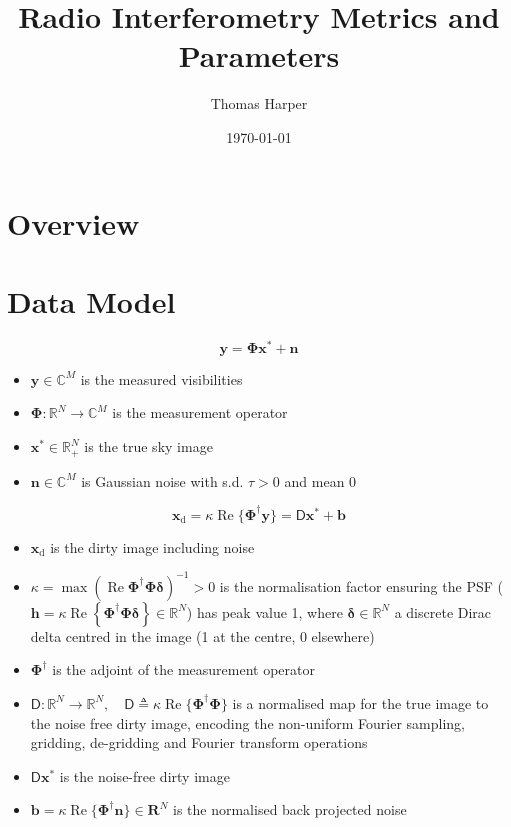 \documentclass[11pt]{article}
\title{Radio Interferometry Metrics and Parameters}
\author{Thomas Harper}
\date{\today}
\newcommand{\D}{\boldsymbol{\mathsf D}}
\newcommand{\dirty}{\boldsymbol x_{\text{d}}}
\newcommand{\true}{\boldsymbol{x^{*}}}
\begin{document}
\maketitle
\newpage
\tableofcontents
\newpage

\section{Overview}

\section{Data Model}
\label{sec:data-model}

\begin{equation}
\boldsymbol y = \boldsymbol\Phi \true + \boldsymbol n
\end{equation}
\begin{itemize}
    \item $\boldsymbol y\in \mathbb C^M$ is the measured visibilities
    \item $\boldsymbol\Phi: \mathbb R^N \to \mathbb C^M$  is the measurement operator
    \item $\true\in\mathbb R_+^N$ is the true sky image
    \item $\boldsymbol n\in\mathbb C^M$ is Gaussian noise with s.d. $\tau>0$ and mean $0$
\end{itemize}

\begin{equation}
\dirty = \kappa\operatorname{Re}\{\boldsymbol\Phi^\dagger \boldsymbol y\} = \D\true + \boldsymbol{b}
\end{equation}

\begin{itemize}
    \item $\dirty$ is the dirty image including noise
    \item $\kappa=\max(\operatorname{Re}{\boldsymbol\Phi^\dagger\boldsymbol\Phi\boldsymbol\delta})^{-1}>0$ is the normalisation factor ensuring the PSF ($\boldsymbol{h}=\kappa \operatorname{Re}\left\{\boldsymbol{\Phi}^{\dagger} \boldsymbol{\Phi} \boldsymbol{\delta}\right\} \in \mathbb{R}^N$) has peak value 1, where $\boldsymbol{\mathbf\delta} \in \mathbb R^N$ a discrete Dirac delta centred in the image (1 at the centre, 0 elsewhere)
    \item $\boldsymbol\Phi^\dagger$ is the adjoint of the measurement operator
    \item $\D:\mathbb R^N\to\mathbb R^N,\quad \D \triangleq \kappa\operatorname{Re}\{\boldsymbol{\Phi}^{\dagger}\boldsymbol{\Phi}\}$ is a normalised map for the true image to the noise free dirty image, encoding the non-uniform Fourier sampling, gridding, de-gridding and Fourier transform operations
    \item $\D\true$ is the noise-free dirty image
    \item $\boldsymbol{b} = \kappa\operatorname{Re}\{\boldsymbol\Phi^\dagger\boldsymbol n\}\in\mathbf R^N$ is the normalised back projected noise
\end{itemize}
\end{document}
